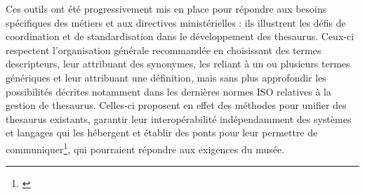 Ces outils ont été progressivement mis en place pour répondre aux besoins spécifiques des métiers et aux directives ministérielles : ils illustrent les défis de coordination et de standardisation dans le développement des \gls{thesaurus}. Ceux-ci respectent l'organisation générale recommandée en choisissant des termes descripteurs, leur attribuant des synonymes, les reliant à un ou plusieurs termes génériques et leur attribuant une définition, mais sans plus approfondir les possibilités décrites notamment dans les dernières normes ISO relatives à la gestion de \gls{thesaurus}. Celles-ci proposent en effet des méthodes pour unifier des \gls{thesaurus} existants, garantir leur interopérabilité indépendamment des systèmes et langages qui les hébergent et établir des ponts pour leur permettre de communiquer\footnote{\cite{chichereauNormesConceptionGestion2007}}, qui pourraient répondre aux exigences du musée.
